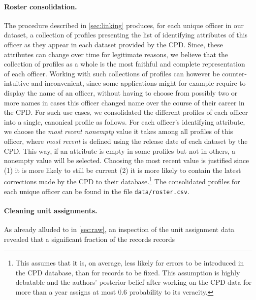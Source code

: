 \paragraph{Roster consolidation.}
The procedure described in \cref{sec:linking} produces, for each unique officer
in our dataset, a collection of profiles presenting the list of identifying
attributes of this officer as they appear in each dataset provided by the CPD.
Since, these attributes can change over time for legitimate reasons, we believe
that the collection of profiles as a whole is the most faithful and complete
representation of each officer. Working with such collections of profiles can
however be counter-intuitive and inconvenient, since some applications might
for example require to display the name of an officer, without having to choose
from possibly two or more names in cases this officer changed name over the
course of their career in the CPD. For such use cases, we consolidated the
different profiles of each officer into a single, canonical profile as follows.
For each officer's identifying attribute, we choose the \emph{most recent
nonempty} value it takes among all profiles of this officer, where \emph{most
recent} is defined using the release date of each dataset by the CPD. This way,
if an attribute is empty in some profiles but not in others, a nonempty value
will be selected. Choosing the most recent value is justified since (1) it is
more likely to still be current (2) it is more likely to contain the latest
corrections made by the CPD to their database.\footnote{This assumes that it
is, on average, less likely for errors to be introduced in the CPD database,
than for records to be fixed. This assumption is highly debatable and the
authors' posterior belief after working on the CPD data for more than a year
assigns at most $0.6$ probability to its veracity.} The consolidated profiles
for each unique officer can be found in the file \texttt{data/roster.csv}.

\paragraph{Cleaning unit assignments.} As already alluded to in \cref{sec:raw},
an inspection of the unit assignment data revealed that a significant fraction
of the records records 
